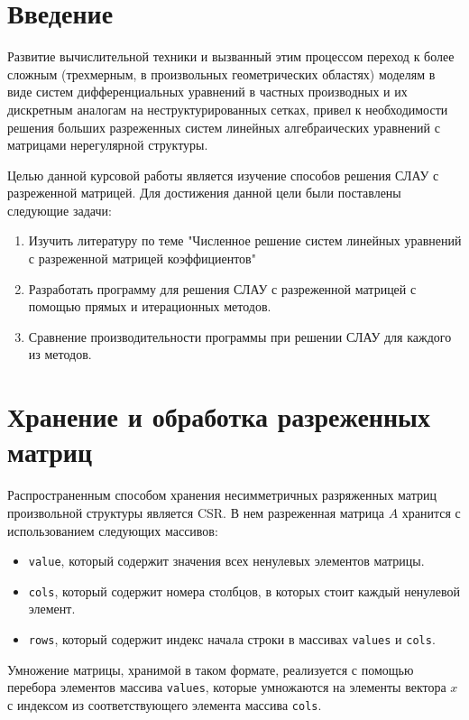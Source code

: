\documentclass[a4paper, fontsize=14pt]{article}
\begin{document}

\newpage

\tableofcontents

\newpage

\section*{Введение}

Развитие вычислительной техники и вызванный этим процессом переход к более сложным (трехмерным, 
в произвольных геометрических областях) моделям в виде систем дифференциальных уравнений в 
частных производных и их дискретным аналогам на неструктурированных сетках, привел к 
необходимости решения больших разреженных систем линейных алгебраических уравнений с 
матрицами нерегулярной структуры.

Целью данной курсовой работы является изучение способов решения СЛАУ с разреженной матрицей.
Для достижения данной цели были поставлены следующие задачи:
\begin{enumerate}
    \item Изучить литературу по теме "Численное решение систем линейных уравнений с разреженной
        матрицей коэффициентов"
    \item Разработать программу для решения СЛАУ с разреженной матрицей с помощью прямых и
        итерационных методов.
    \item Сравнение производительности программы при решении СЛАУ для каждого из методов.
\end{enumerate}
\newpage
\section{Хранение и обработка разреженных матриц}
Распространенным способом хранения несимметричных разряженных матриц произвольной структуры является
CSR. В нем разреженная матрица $A$ хранится с использованием следующих массивов:
\begin{itemize}
    \item \verb|value|, который содержит значения всех ненулевых элементов матрицы.
    \item \verb|cols|, который содержит номера столбцов, в которых стоит каждый ненулевой элемент.
    \item \verb|rows|, который содержит индекс начала строки в массивах \verb|values| и \verb|cols|.
\end{itemize}
Умножение матрицы, хранимой в таком формате, реализуется с помощью перебора элементов массива
\verb|values|, которые умножаются на элементы вектора $x$ с индексом из соответствующего
элемента массива \verb|cols|.\cite{bal} 
\end{document}
